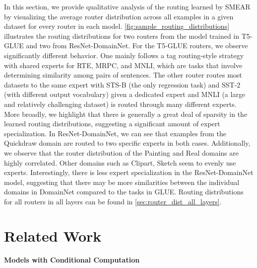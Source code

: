 \documentclass{article}
\theoremstyle{plain}
\theoremstyle{definition}
\theoremstyle{remark}
\begin{document}
In this section, we provide qualitative analysis of the routing learned by SMEAR by visualizing the average router distribution across all examples in a given dataset for every router in each model.
\cref{fig:sample_routing_distributions} illustrates the routing distributions for two routers from the model trained in T5-GLUE and two from ResNet-DomainNet. 
For the T5-GLUE routers, we observe significantly different behavior. One mainly follows a tag routing-style strategy with shared experts for RTE, MRPC, and MNLI, which are tasks that involve determining similarity among pairs of sentences. 
The other router routes most datasets to the same expert with STS-B (the only regression task) and SST-2 (with different output vocabulary) given a dedicated expert and MNLI (a large and relatively challenging dataset) is routed through many different experts.
More broadly, we highlight that there is generally a great deal of sparsity in the learned routing distributions, suggesting a significant amount of expert specialization.
In ResNet-DomainNet, we can see that examples from the Quickdraw domain are routed to two specific experts in both cases.
Additionally, we observe that the router distribution of the Painting and Real domains are highly correlated. 
Other domains such as Clipart, Sketch seem to evenly use experts.
Interestingly, there is less expert specialization in the ResNet-DomainNet model, suggesting that there may be more similarities between the individual domains in DomainNet compared to the tasks in GLUE.
Routing distributions for all routers in all layers can be found in \cref{sec:router_dist_all_layers}.

\section{Related Work}
\label{sec:related}

\paragraph{Models with Conditional Computation}
\end{document}
